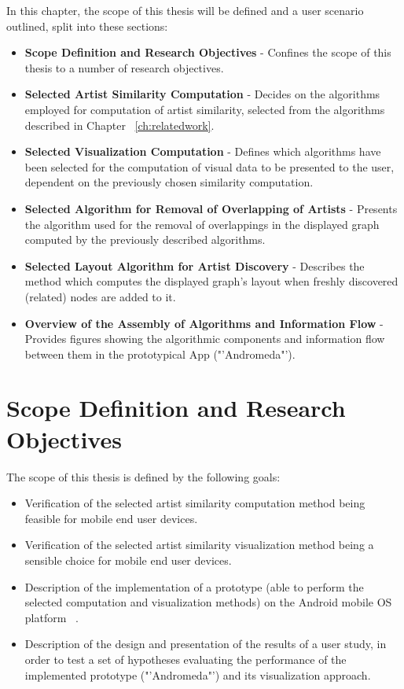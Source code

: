 In this chapter, the scope of this thesis will be defined and a user scenario outlined, split into these sections:

\begin{itemize}
	\item \textbf {Scope Definition and Research Objectives} - Confines the scope of this thesis to a number of research objectives.
	\item \textbf {Selected Artist Similarity Computation} - Decides on the algorithms employed for computation of artist similarity, selected from the algorithms described in Chapter ~\ref{ch:relatedwork}.
	\item \textbf {Selected Visualization Computation} - Defines which algorithms have been selected for the computation of visual data to be presented to the user, dependent on the previously chosen similarity computation.
	\item \textbf {Selected Algorithm for Removal of Overlapping of Artists} - Presents the algorithm used for the removal of overlappings in the displayed graph computed by the previously described algorithms.
	\item \textbf {Selected Layout Algorithm for Artist Discovery} - Describes the method which computes the displayed graph's layout when freshly discovered (related) nodes are added to it.
	\item \textbf {Overview of the Assembly of Algorithms and Information Flow} - Provides figures showing the algorithmic components and information flow between them in the prototypical App ("'Andromeda"').
\end{itemize}

\section{Scope Definition and Research Objectives}

The scope of this thesis is defined by the following goals: 

\begin{itemize}
	\item Verification of the selected artist similarity computation method being feasible for mobile end user devices.
	\item Verification of the selected artist similarity visualization method being a sensible choice for mobile end user devices.
	\item Description of the implementation of a prototype (able to perform the selected computation and visualization methods) on the Android mobile OS platform ~\cite{url:android}.
	\item Description of the design and presentation of the results of a user study, in order to test a set of hypotheses evaluating the performance of the implemented prototype ("'Andromeda"') and its visualization approach.
\end{itemize}

